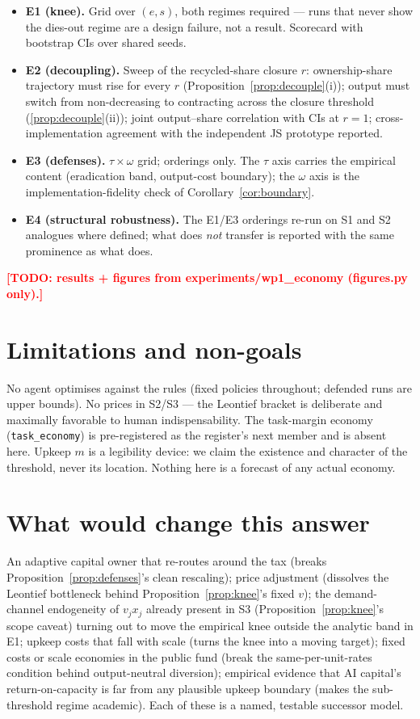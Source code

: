 \documentclass[11pt]{article}
\newcommand{\TODO}[1]{\textcolor{red}{\textbf{[TODO: #1]}}}
\begin{document}
\begin{itemize}
  \item \textbf{E1 (knee).} Grid over $(e, s)$, both regimes required ---
  runs that never show the dies-out regime are a design failure, not a
  result. Scorecard with bootstrap CIs over shared seeds.
  \item \textbf{E2 (decoupling).} Sweep of the recycled-share closure $r$:
  ownership-share trajectory must rise for every $r$
  (Proposition~\ref{prop:decouple}(i)); output must switch from
  non-decreasing to contracting across the closure threshold
  (\ref{prop:decouple}(ii)); joint output--share correlation with CIs at
  $r=1$; cross-implementation agreement with the independent JS prototype
  reported.
  \item \textbf{E3 (defenses).} $\tau \times \omega$ grid; orderings only.
  The $\tau$ axis carries the empirical content (eradication band, output-cost
  boundary); the $\omega$ axis is the implementation-fidelity check of
  Corollary~\ref{cor:boundary}.
  \item \textbf{E4 (structural robustness).} The E1/E3 orderings re-run on
  S1 and S2 analogues where defined; what does \emph{not} transfer is
  reported with the same prominence as what does.
\end{itemize}

\TODO{results + figures from experiments/wp1\_economy (figures.py only).}

\section{Limitations and non-goals}\label{sec:limits}

No agent optimises against the rules (fixed policies throughout; defended
runs are upper bounds). No prices in S2/S3 --- the Leontief bracket is
deliberate and maximally favorable to human indispensability. The task-margin
economy (\texttt{task\_economy}) is pre-registered as the register's next
member and is absent here. Upkeep $m$ is a legibility device: we claim the
existence and character of the threshold, never its location. Nothing here
is a forecast of any actual economy.

\section{What would change this answer}\label{sec:change}

An adaptive capital owner that re-routes around the tax (breaks
Proposition~\ref{prop:defenses}'s clean rescaling); price adjustment
(dissolves the Leontief bottleneck behind Proposition~\ref{prop:knee}'s
fixed $v$); the demand-channel endogeneity of $v_j x_j$ already present in
S3 (Proposition~\ref{prop:knee}'s scope caveat) turning out to move the
empirical knee outside the analytic band in E1; upkeep costs that fall with
scale (turns the knee into a moving target); fixed costs or scale economies
in the public fund (break the same-per-unit-rates condition behind
output-neutral diversion); empirical evidence that AI capital's
return-on-capacity is far from any plausible upkeep boundary (makes the
sub-threshold regime academic). Each of these is a named, testable
successor model.



\end{document}
